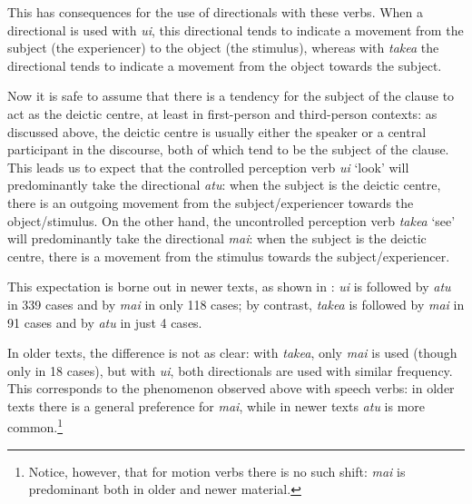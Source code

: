 This has consequences for the use of directionals with these verbs. When a directional is used with \textit{u{\ꞌ}i}, this directional tends to indicate a movement from the subject (the experiencer) to the object (the stimulus), whereas with \textit{take{\ꞌ}a} the directional tends to indicate a movement from the object towards the subject. 

Now it is safe to assume that there is a tendency for the subject of the clause to act as the deictic centre, at least in first-person and third-person contexts: as discussed above, the deictic centre is usually either the speaker or a central participant in the discourse, both of which tend to be the subject of the clause. This leads us to expect that the controlled perception verb \textit{u{\ꞌ}i} ‘look’ will predominantly take the directional \textit{atu}: when the subject is the deictic centre, there is an outgoing movement from the subject/experiencer towards the object/stimulus. On the other hand, the uncontrolled perception verb \textit{take{\ꞌ}a} ‘see’ will predominantly take the directional \textit{mai}: when the subject is the deictic centre, there is a movement from the stimulus towards the subject/experiencer. 

This expectation is borne out in newer texts, as shown in : \textit{u{\ꞌ}i} is followed by \textit{atu} in 339 cases and by \textit{mai} in only 118 cases; by contrast, \textit{take{\ꞌ}a} is followed by \textit{mai} in 91 cases and by \textit{atu} in just 4 cases.

In older texts, the difference is not as clear: with \textit{take{\ꞌ}a}, only \textit{mai} is used (though only in 18 cases), but with \textit{u{\ꞌ}i}, both directionals are used with similar frequency. This corresponds to the phenomenon observed above with speech verbs: in older texts there is a general preference for \textit{mai}, while in newer texts \textit{atu} is more common.\footnote{\label{fn:366}Notice, however, that for motion verbs there is no such shift: \textit{mai} is predominant both in older and newer material.}

